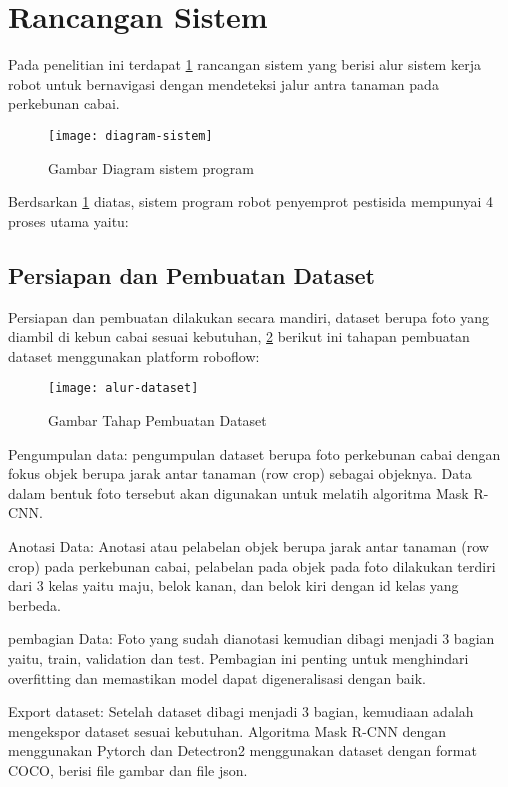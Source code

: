\section{Rancangan Sistem}
Pada penelitian ini terdapat \cref{fig:diagramsistem} rancangan sistem yang berisi alur sistem  kerja robot untuk bernavigasi dengan mendeteksi jalur antra tanaman pada perkebunan cabai.

\begin{figure}[H]
	\centering
	\texttt{[image: diagram-sistem]}
	\caption{Gambar Diagram sistem program}
	\label{fig:diagramsistem}
\end{figure}

Berdsarkan \cref{fig:diagramsistem} diatas, sistem program robot penyemprot pestisida mempunyai 4 proses utama yaitu: 


\subsection{Persiapan dan Pembuatan Dataset}
Persiapan dan pembuatan dilakukan secara mandiri, dataset berupa foto yang diambil di kebun cabai sesuai kebutuhan, \cref{fig:alurdataset} berikut ini tahapan pembuatan dataset menggunakan platform roboflow:

\begin{figure}[H]
	\centering
	\texttt{[image: alur-dataset]}
	\caption{Gambar Tahap Pembuatan Dataset}
	\label{fig:alurdataset}
\end{figure}

\begin{packed_item}
	\item Pengumpulan data: pengumpulan dataset berupa foto perkebunan cabai dengan fokus objek berupa jarak antar tanaman (row crop) sebagai objeknya. Data dalam bentuk foto tersebut akan digunakan untuk melatih algoritma Mask R-CNN.
	\item Anotasi Data: Anotasi atau pelabelan objek berupa jarak antar tanaman (row crop) pada perkebunan cabai, pelabelan pada objek pada foto dilakukan terdiri dari 3 kelas yaitu maju, belok kanan, dan belok kiri dengan id kelas yang berbeda.
	\item pembagian Data: Foto yang sudah dianotasi kemudian dibagi menjadi 3 bagian yaitu, train, validation dan test. Pembagian ini penting untuk menghindari overfitting dan memastikan
	model dapat digeneralisasi dengan baik.
	\item Export dataset: Setelah dataset dibagi menjadi 3 bagian, kemudiaan adalah mengekspor dataset sesuai kebutuhan. Algoritma Mask R-CNN dengan menggunakan Pytorch dan Detectron2 menggunakan dataset dengan format COCO, berisi file gambar dan file json.
\end{packed_item}

